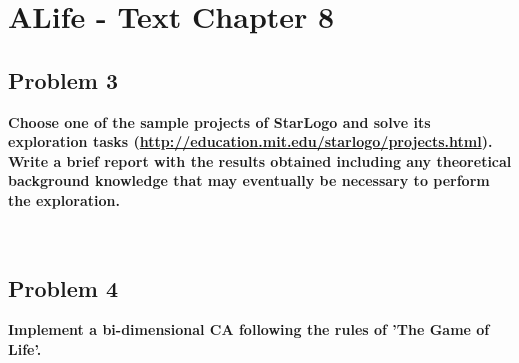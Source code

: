 
\chapter{ALife - Text Chapter 8}

\section{Problem 3}
\textbf{
Choose one of the sample projects of StarLogo and solve its exploration tasks (\url{http://education.mit.edu/starlogo/projects.html}). Write a brief report with the results obtained including any theoretical background knowledge that may eventually be necessary to perform the exploration.
}

\hfill \\


\section{Problem 4}
\textbf{
Implement a bi-dimensional CA following the rules of 'The Game of Life'.
}

\hfill \\

